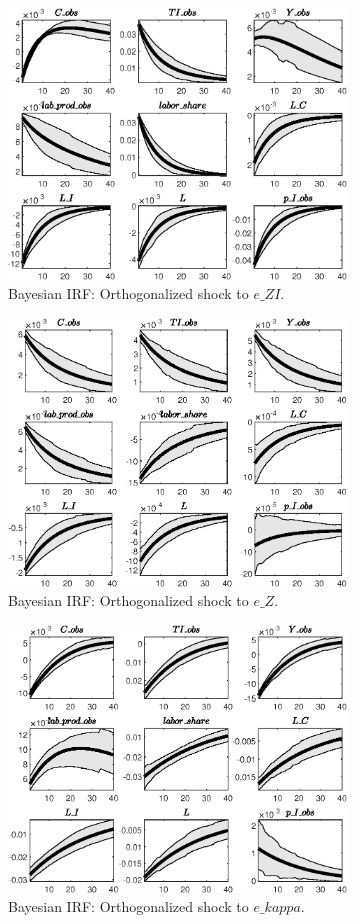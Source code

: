  
\begin{figure}[H]
\centering 
\includegraphics[width=0.80\textwidth]{directed_search_est/Output/directed_search_est_Bayesian_IRF_e_ZI_1}
\caption{Bayesian IRF: Orthogonalized shock to $e\_ZI$.}
\label{Fig:BayesianIRF:e_ZI:1}
\end{figure}
 
\begin{figure}[H]
\centering 
\includegraphics[width=0.80\textwidth]{directed_search_est/Output/directed_search_est_Bayesian_IRF_e_Z_1}
\caption{Bayesian IRF: Orthogonalized shock to $e\_Z$.}
\label{Fig:BayesianIRF:e_Z:1}
\end{figure}
 
\begin{figure}[H]
\centering 
\includegraphics[width=0.80\textwidth]{directed_search_est/Output/directed_search_est_Bayesian_IRF_e_kappa_1}
\caption{Bayesian IRF: Orthogonalized shock to $e\_kappa$.}
\label{Fig:BayesianIRF:e_kappa:1}
\end{figure}
 
